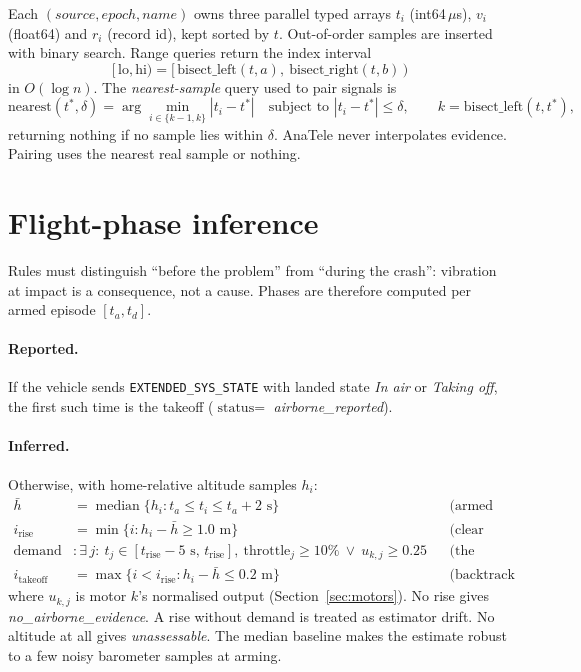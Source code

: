 \documentclass[11pt,a4paper]{article}
\newcommand{\code}[1]{\texttt{#1}}
\begin{document}
Each $(source, epoch, name)$ owns three parallel typed arrays $t_i$ (int64\,$\mu$s), $v_i$ (float64)
and $r_i$ (record id), kept sorted by $t$. Out-of-order samples are inserted with binary search.
Range queries return the index interval
\[
[\,\text{lo},\text{hi}) = [\,\text{bisect\_left}(t,a),\ \text{bisect\_right}(t,b)\,)
\]
in $O(\log n)$. The \emph{nearest-sample} query used to pair signals is
\[
\text{nearest}(t^\ast,\delta)=\arg\min_{i\in\{k-1,k\}}|t_i-t^\ast|
\quad\text{subject to } |t_i-t^\ast|\le\delta,\qquad k=\text{bisect\_left}(t,t^\ast),
\]
returning nothing if no sample lies within $\delta$. AnaTele never interpolates evidence. Pairing
uses the nearest real sample or nothing.

\section{Flight-phase inference}

Rules must distinguish ``before the problem'' from ``during the crash'': vibration at impact is a
consequence, not a cause. Phases are therefore computed per armed episode $[t_a, t_d]$.

\paragraph{Reported.} If the vehicle sends \code{EXTENDED\_SYS\_STATE} with landed state \emph{In
air} or \emph{Taking off}, the first such time is the takeoff ($\text{status}=$
\emph{airborne\_reported}).

\paragraph{Inferred.} Otherwise, with home-relative altitude samples $h_i$:
\begin{align*}
\bar h &= \operatorname{median}\{h_i : t_a \le t_i \le t_a + 2\text{ s}\}
   && \text{(armed baseline)}\\
i_{\text{rise}} &= \min\{i : h_i - \bar h \ge 1.0\text{ m}\}
   && \text{(clear climb)}\\
\text{demand} &: \exists\, j:\ t_j\in[t_{\text{rise}}-5\text{ s},\,t_{\text{rise}}],\ 
   \text{throttle}_j \ge 10\% \ \vee\ u_{k,j}\ge 0.25
   && \text{(the motors were driving it)}\\
i_{\text{takeoff}} &= \max\{i < i_{\text{rise}} : h_i - \bar h \le 0.2\text{ m}\}
   && \text{(backtrack to lift-off)}
\end{align*}
where $u_{k,j}$ is motor $k$'s normalised output (Section~\ref{sec:motors}). No rise gives
\emph{no\_airborne\_evidence}. A rise without demand is treated as estimator drift. No altitude at
all gives \emph{unassessable}. The median baseline makes the estimate robust to a few noisy
barometer samples at arming.
\end{document}
